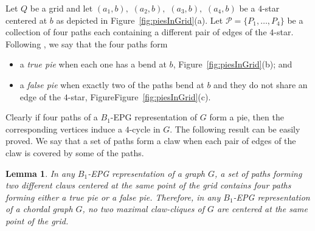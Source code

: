 \documentclass[9pt]{entcs}
\newtheorem{lema}[thm]{Lemma}%
\newtheorem{defi}[thm]{Definition}%
\begin{document}

Let $ Q $ be a grid and let $ (a_1, b),$ $(a_2, b),$ $(a_3, b),$ $(a_4, b)$ be a $4$-star centered at $b$ as depicted in Figure~\ref{fig:piesInGrid}(a). Let $ \mathcal{P} = \{P_1, \dots , P_4\}$ be a collection of four paths each containing a different pair of edges of the $4$-star.
Following \cite{golumbic2009}, we say that the four paths form
\begin{itemize}
\item a \emph{true pie} %
when each one has a bend at $b$, Figure~\ref{fig:piesInGrid}(b); and 
\item a \emph {false pie} when exactly two of the paths %
bend at $b$ and they do not share an edge of the $4$-star, FigureFigure~\ref{fig:piesInGrid}(c). %

%


\end{itemize}

Clearly if four paths of a $B_1$-EPG representation of $G$ form a pie, then the corresponding vertices induce a $4$-cycle in $G$. %
The following result can be easily proved. We say that a set of paths form a claw when each pair of edges of the claw is covered by some of the paths.

\begin{lema}\label{lem:twoClawNotSameCenterInChordal}
In any $B_1$-EPG representation of a graph $G$, a set of paths forming two different claws centered at the same point of the grid contains four paths forming either a true pie or a false pie. Therefore, in any $B_1$-EPG representation of a chordal graph $G$, no two maximal claw-cliques of $G$ are centered at the same point of the grid.
\end{lema}

\end{document}

